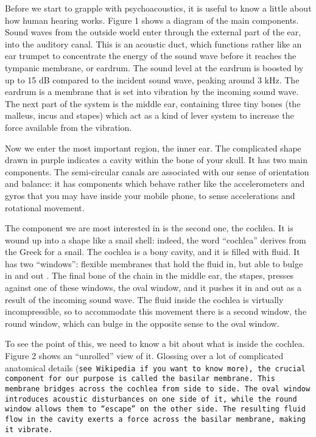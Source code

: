 

  Before we start to grapple with psychoacoustics, it is useful to know a 
  little about how human hearing works. Figure 1 shows a diagram of the main 
  components. Sound waves from the outside world enter through the external 
  part of the ear, into the auditory canal. This is an acoustic duct, which 
  functions rather like an ear trumpet to concentrate the energy of the sound 
  wave before it reaches the tympanic membrane, or eardrum. The sound level at 
  the eardrum is boosted by up to 15 dB compared to the incident sound wave, 
  peaking around 3 kHz. The eardrum is a membrane that is set into vibration by 
  the incoming sound wave. The next part of the system is the middle ear, 
  containing three tiny bones (the malleus, incus and stapes) which act as a 
  kind of lever system to increase the force available from the vibration. 


  Now we enter the most important region, the inner ear. The complicated shape 
  drawn in purple indicates a cavity within the bone of your skull. It has two 
  main components. The semi-circular canals are associated with our sense of 
  orientation and balance: it has components which behave rather like the 
  accelerometers and gyros that you may have inside your mobile phone, to sense 
  accelerations and rotational movement. 

  The component we are most interested in is the second one, the cochlea. It is 
  wound up into a shape like a snail shell: indeed, the word ``cochlea'' 
  derives from the Greek for a snail. The cochlea is a bony cavity, and it is 
  filled with fluid. It has two ``windows'': flexible membranes that hold the 
  fluid in, but able to bulge in and out . The final bone of the chain in the 
  middle ear, the stapes, presses against one of these windows, the oval 
  window, and it pushes it in and out as a result of the incoming sound wave. 
  The fluid inside the cochlea is virtually incompressible, so to accommodate 
  this movement there is a second window, the round window, which can bulge in 
  the opposite sense to the oval window. 

  To see the point of this, we need to know a bit about what is inside the 
  cochlea. Figure 2 shows an ``unrolled'' view of it. Glossing over a lot of 
  complicated anatomical details (\tt{}see Wikipedia\rm{} if you want to know 
  more), the crucial component for our purpose is called the basilar membrane. 
  This membrane bridges across the cochlea from side to side. The oval window 
  introduces acoustic disturbances on one side of it, while the round window 
  allows them to ``escape'' on the other side. The resulting fluid flow in the 
  cavity exerts a force across the basilar membrane, making it vibrate. 

